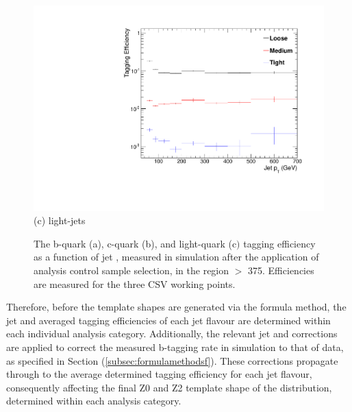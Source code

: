 \begin{figure}[ht]
\begin{minipage}[b]{0.48\linewidth}
\centering
\includegraphics[width = 1.0\linewidth]{plots/lighjet_PtDistribution_Htbin_Template_375.pdf}
\centering (c) light-jets
\end{minipage}
\caption[The b-quark (a), c-quark  (b), and light-quark (c$)$ tagging efficiency as a function of jet \pt, measured in simulation after the application of the \alphat analysis \mupjets control sample selection, in the region \theht $>$ 375.]{The b-quark (a), c-quark  (b), and light-quark (c$)$ tagging efficiency as a function of jet \pt, measured in simulation after the application of \alphat analysis \mupjets control sample selection, in the region \theht $>$ 375. Efficiencies are measured for the three \ac{CSV} working points.}
\label{fig:templatetaggingefficiencies}
\end{figure}
\FloatBarrier

Therefore, before the template shapes are generated via the formula method, the jet \pt and \eta averaged tagging efficiencies of each jet flavour are determined within each individual analysis category. Additionally, the relevant jet \pt and \eta corrections are applied to correct the measured b-tagging rate in simulation to that of data, as specified in Section (\ref{subsec:formulamethodsf}). These corrections propagate through to the average determined tagging efficiency for each jet flavour, consequently affecting the final Z0 and Z2 template shape of the \nbreco distribution, determined within each analysis category. 

